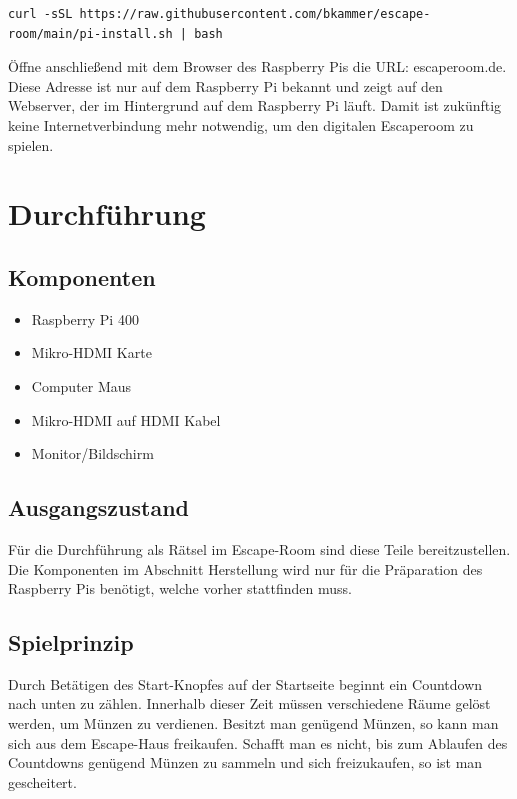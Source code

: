 \documentclass[12pt, letterpaper]{article}
\begin{document}
\begin{verbatim}
curl -sSL https://raw.githubusercontent.com/bkammer/escape-room/main/pi-install.sh | bash
\end{verbatim}

Öffne anschließend mit dem Browser des Raspberry Pis die URL: escaperoom.de.
Diese Adresse ist nur auf dem Raspberry Pi bekannt und zeigt auf den Webserver, der im Hintergrund auf dem Raspberry Pi läuft.
Damit ist zukünftig keine Internetverbindung mehr notwendig, um den digitalen Escaperoom zu spielen.

\section{Durchführung}
\subsection{Komponenten}

\begin{itemize}
	\item Raspberry Pi 400
    \item Mikro-HDMI Karte
	\item Computer Maus
	\item Mikro-HDMI auf HDMI Kabel
	\item Monitor/Bildschirm
\end{itemize}

\subsection{Ausgangszustand}

Für die Durchführung als Rätsel im Escape-Room sind diese Teile bereitzustellen.
Die Komponenten im Abschnitt Herstellung wird nur für die Präparation des Raspberry Pis benötigt, welche vorher stattfinden muss.

\subsection{Spielprinzip}

Durch Betätigen des Start-Knopfes auf der Startseite beginnt ein Countdown nach unten zu zählen.
Innerhalb dieser Zeit müssen verschiedene Räume gelöst werden, um Münzen zu verdienen.
Besitzt man genügend Münzen, so kann man sich aus dem Escape-Haus freikaufen.
Schafft man es nicht, bis zum Ablaufen des Countdowns genügend Münzen zu sammeln und sich freizukaufen, so ist man gescheitert.
\end{document}
